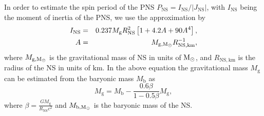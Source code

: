 \documentclass[fleqn,usenatbib]{mnras}
\newcommand{\solm}{\ensuremath{\rm{M_{\odot}}}\xspace}
\newcommand{\km}{\ensuremath{\mathrm{km}}}
\begin{document}
In order to estimate the spin period of the PNS $P_{\mathrm{NS}}=I_{\mathrm{NS}}/|J_{\mathrm{NS}}|$, with $I_{\mathrm{NS}}$ being the moment of inertia of the PNS, we use the approximation by \citet{Lattimer2004}
\begin{eqnarray}
    I_{\mathrm{NS}} &=& 0.237M_{\mathrm{g}}R_{\text{NS}}^2\left[1 + 4.2 A  + 90 A^4\right],\\
    A &=&  M_{\text{g},\solm}R_{\text{NS},\km}^{-1},\nonumber
    \label{equ: ins}
\end{eqnarray}
where $M_{\text{g},\solm}$ is the gravitational mass of NS in units of $\solm$, and $R_{\text{NS},\km}$ is the radius of the NS in units of $\km$.
In the above equation the gravitational mass $M_{\mathrm{g}}$ can be estimated from the baryonic mass $M_{\mathrm{b}}$  as \citep{Lattimer2000}
\begin{equation}
    M_{\mathrm{g}} = M_{\mathrm{b}} - \frac{0.6 \beta}{1-0.5\beta}  M_{\mathrm{g}}, 
\end{equation}
where $\beta=\frac{GM_{\mathrm{g}}}{R_{\mathrm{NS}}c^2}$ and
$M_{\text{b},\solm}$ is the baryonic mass of the NS.


\newpage

\label{lastpage}
\end{document}
